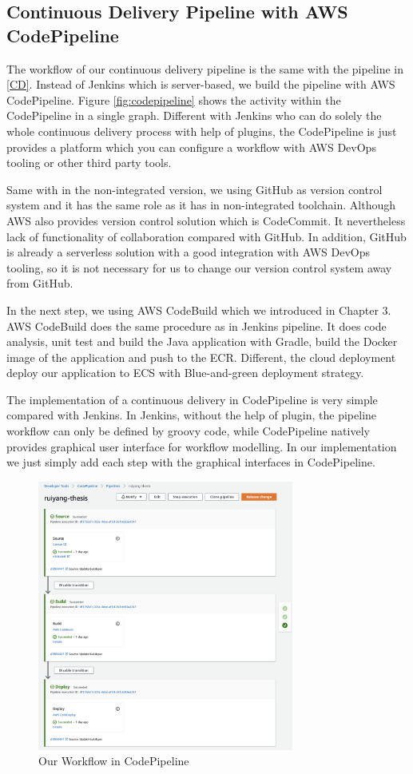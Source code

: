 \subsection{Continuous Delivery Pipeline with AWS CodePipeline}
The workflow of our continuous delivery pipeline is the same with the pipeline in \ref{CD}. Instead of Jenkins which is server-based, we build the pipeline with AWS CodePipeline. Figure \ref{fig:codepipeline} shows the activity within the CodePipeline in a single graph. Different with Jenkins who can do solely the whole continuous delivery process with help of plugins, the CodePipeline is just provides a platform which you can configure a workflow with AWS DevOps tooling or other third party tools. 
\par
Same with in the non-integrated version, we using GitHub as version control system and it has the same role as it has in non-integrated toolchain. Although AWS also provides version control solution which is CodeCommit. It nevertheless lack of functionality of collaboration compared with GitHub. In addition, GitHub is already a serverless solution with a good integration with AWS DevOps tooling, so it is not necessary for us to change our version control system away from GitHub. 
\par
In the next step, we using AWS CodeBuild which we introduced in Chapter 3. AWS CodeBuild does the same procedure as in Jenkins pipeline. It does code analysis, unit test and build the Java application with Gradle, build the Docker image of the application and push to the ECR. Different, the cloud deployment deploy our application to ECS with Blue-and-green deployment strategy.
\par
The implementation of a continuous delivery in CodePipeline is very simple compared with Jenkins. In Jenkins, without the help of plugin, the pipeline workflow can only be defined by groovy code, while CodePipeline natively provides graphical user interface for workflow modelling. In our implementation we just simply add each step with the graphical interfaces in CodePipeline.
\begin{figure}[h]
    \centering
    \includegraphics[width=0.75\textwidth]{pics/cp-interface.png}
    \caption{Our Workflow in CodePipeline}
    \label{fig:cp-edit}
\end{figure}
